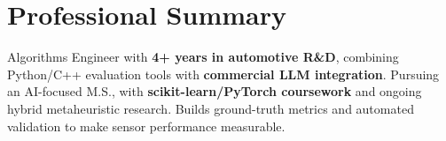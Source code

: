 \section*{Professional Summary}
\begin{center}
    \begin{minipage}{0.97\textwidth}
        \small{Algorithms Engineer with \textbf{4+ years in automotive R\&D}, combining Python/C++ evaluation tools with \textbf{commercial LLM integration}. Pursuing an AI-focused M.S., with \textbf{scikit-learn/PyTorch coursework} and ongoing hybrid metaheuristic research. Builds ground-truth metrics and automated validation to make sensor performance measurable.}
    \end{minipage}
\end{center}
\vspace{-5pt}